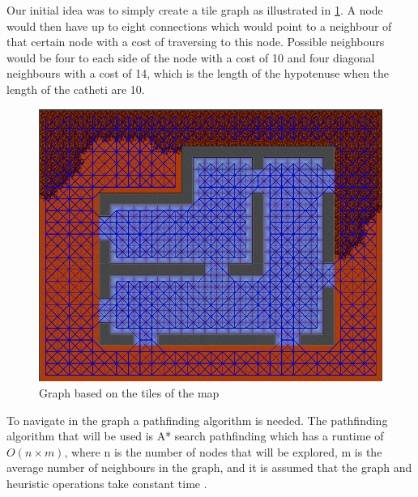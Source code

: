 Our initial idea was to simply create a tile graph\cite{AIG:Millington} as illustrated in \ref{gridGraph}.
A node would then have up to eight connections which would point to a neighbour of that certain node with a cost of traversing to this node.
Possible neighbours would be four to each side of the node with a cost of 10 and four diagonal neighbours with a cost of 14, which is the length of the hypotenuse when the length of the catheti are 10.
\begin{figure}[H]
	\includegraphics[width=\textwidth]{figures/astar/gridGraph}
	\caption{Graph based on the tiles of the map}
	\label{gridGraph}
\end{figure}

To navigate in the graph a pathfinding algorithm is needed. 
The pathfinding algorithm that will be used is A* search pathfinding which has a runtime of $O(n \times m)$, where n is the number of nodes that will be explored, m is the average number of neighbours in the graph, and it is assumed that the graph and heuristic operations take constant time \cite{AIG:Millington}.

